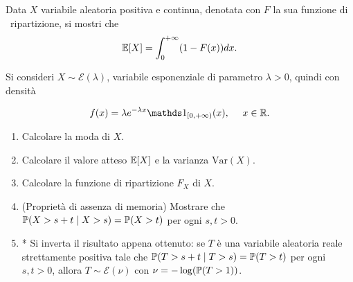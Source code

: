 Data $X$ variabile aleatoria positiva e continua, denotata con $F$ la sua funzione di \ ripartizione, si mostri che
\begin{equation*}
\mathbb{E}[ X] =\int _{0}^{+\infty }( 1-F( x)) dx.
\end{equation*}

Si consideri $X\sim \mathcal{E}( \lambda )$, variabile esponenziale di parametro $\lambda  >0$, quindi con densità


\begin{equation*}
f( x) =\lambda e^{-\lambda x} \Ind_{[ 0,+\infty )}( x) ,\ \ \ \ x\in \mathbb{R} .
\end{equation*}
\begin{enumerate}
\item Calcolare la moda di $X$.
\item Calcolare il valore atteso $\mathbb{E}[ X]$ e la varianza $\mathrm{Var}( X)$.
\item Calcolare la funzione di ripartizione $F_{X}$ di $X$.
\item (Proprietà di assenza di memoria) Mostrare che $\mathbb{P}( X >s+t \mid X >s) =\mathbb{P}( X >t)$ per ogni $s,t >0$.
\item * Si inverta il risultato appena ottenuto: se $T$ è una variabile aleatoria reale strettamente positiva tale che $\mathbb{P}( T >s+t\mid T >s) =\mathbb{P}( T >t)$ per ogni $s,t >0$, allora $T\sim \mathcal{E}( \nu )$ con $\nu =-\log(\mathbb{P}( T >1))$.
\end{enumerate}

